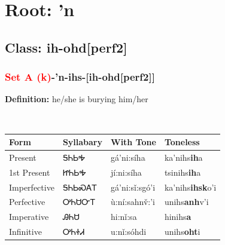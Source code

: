 \needspace{4in}
\section*{Root: 'n}
\nopagebreak
{}
\needspace{3in}
\subsection*{Class: ih-ohd[perf2]}
\nopagebreak
\needspace{2in}
\subsubsection*{\textcolor{Red}{Set A (k)}{-}\textbf{'n}{-}ihs{-}[ih-ohd[perf2]]}
\nopagebreak
\textbf{Definition: } he/she is burying him/her
\\[0.5em]
\begin{tabularx}{\textwidth}{l X X X}%
\toprule%
\textbf{Form}&\textbf{Syllabary}&\textbf{With Tone}&\textbf{Toneless}\\%
\midrule%
Present&ᎦᏂᏏᎭ&gá’ni:síha&ka'nihs\textbf{ih}a\\%
1st Present&ᏥᏂᏏᎭ&jí:ni:síha&tsinihs\textbf{ih}a\\%
Imperfective&ᎦᏂᏏᏍᎪᎢ&gá’ni:sǐ:sgó’i&ka'nihs\textbf{ihsk}o'i\\%
Perfective&ᎤᏂᏌᏅᎢ&ù:ní:sahnv̌:’i&unihs\textbf{anh}v'i\\%
Imperative&ᎯᏂᏌ&hi:nǐ:sa&hinihs\textbf{a}\\%
Infinitive&ᎤᏂᏐᏗ&u:nǐ:sóhdi&unihs\textbf{oht}i\\%
\bottomrule%
\end{tabularx}
\\[1em]